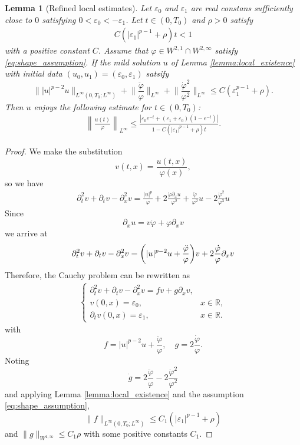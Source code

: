 \documentclass[reqno]{amsart}
\newtheorem{Lemma}[Theorem]{Lemma}
\begin{document}
\begin{Lemma}[Refined local estimates]
\label{lemma:estaimte_of_u_devided}
Let $\varepsilon_0$ and $\varepsilon_1$ are real constans sufficiently close to $0$
satisfying $0 < \varepsilon_0 < - \varepsilon_1$.
Let $t \in (0,T_0)$ and $\rho >0$ satisfy
	\begin{align}
	C ( |\varepsilon_1|^{p-1} + \rho ) t < 1
	\label{eq:condition_for_u_devided}
	\end{align}
with a positive constant $C$.
Assume that $\varphi \in W^{2,1} \cap W^{2,\infty}$
satisfy \eqref{eq:shape_assumption}.
If the mild solution $u$ of Lemma \ref{lemma:local_existence}
with initial data $(u_0,u_1) = (\varepsilon_0,\varepsilon_1)$
satsify 
	\[
	\| |u|^{p-2}u\|_{L^\infty(0,T_0; L^\infty)}
	+ \bigg\|\frac{\ddot \varphi}{\varphi} \bigg\|_{L^\infty}
	+ \bigg\|\frac{\dot \varphi^2}{\varphi^2} \bigg\|_{L^\infty}
	\leq C ( \varepsilon_1^{p-1} + \rho ).
	\]
Then $u$ enjoys the following estimate for $t \in (0,T_0)$:
	\begin{align}\label{eq2mm}
	\left\| \frac{u(t)}{\varphi} \right\|_{ L^{\infty}}
	\leq \frac{|\varepsilon_0 e^{-t} + (\varepsilon_1 + \varepsilon_0)(1-e^{-t})|}{1-C ( |\varepsilon_1|^{p-1} + \rho ) t}.
	\end{align}
\end{Lemma}

\begin{proof}
We make the substitution
	\[
	v(t,x) = \frac{u(t,x)}{\varphi(x)},
	\]
so we have
	\begin{align*}
    \partial_t^2 v + \partial_t v - \partial_x^2 v
	 = \frac{|u|^p}{\varphi}
	 + 2 \frac{\dot \varphi \partial_x u}{\varphi^2}
	 + \frac{\ddot \varphi}{\varphi^2} u
	 - 2 \frac{\dot \varphi^2}{\varphi^3} u
	\end{align*}
Since
	\[
	\partial_x u = v \dot \varphi  + \varphi \partial_x v
	\]
we arrive at
	\[
	\partial_t^2 v + \partial_t v - \partial_x^2 v \\
	= \bigg( |u|^{p-2} u + \frac{\ddot \varphi}{\varphi} \bigg) v
	+ 2 \frac{\dot \varphi}{\varphi} \partial_x v
	\]
Therefore, the Cauchy problem can be rewritten as
	\begin{align*}
	\begin{cases}
	\partial_t^2 v + \partial_t v - \partial_x^2 v  = f v+g\partial_xv, \\
	v(0,x)=\varepsilon_0 , & x \in \mathbb R, \\
	\partial_t v(0,x) =\varepsilon_1 , & x \in \mathbb R.
	\end{cases}
	\end{align*}
with 
	\[
	f = |u|^{p-2}u  + \frac{\ddot \varphi}{\varphi},
	\quad
	g =  2  \frac{\dot \varphi}{\varphi}.
	\]
Noting
	\[
	\dot g = 2 \frac{\ddot \varphi}{\varphi} - 2 \frac{\dot \varphi^2}{\varphi^2}
	\]	
and applying Lemma \ref{lemma:local_existence}
and the assumption \eqref{eq:shape_assumption},
\[
\|f\|_{L^\infty(0,T_0; L^\infty)}
\leq C_1 ( |\varepsilon_1|^{p-1} + \rho )
\]
and $\|g\|_{W^{1,\infty}} \leq C_1 \rho$
with some positive constants $C_1$.
\end{proof}
\end{document}
